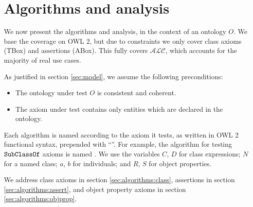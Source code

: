 \documentclass[paper.tex]{subfiles}
\begin{document}
\section{Algorithms and analysis}
\label{sec:algorithms}

We now present the algorithms and analysis, in the context of an ontology $O$.  We base the coverage on OWL 2, but due to constraints we only cover class axioms (TBox) and assertions (ABox).  This fully covers $\mathcal{ALC}$, which accounts for the majority of real use cases.  

As justified in section \ref{sec:model}, we assume the following preconditions:
\begin{itemize}[nosep]
  \item The ontology under test $O$ is consistent and coherent.
  \item The axiom under test contains only entities which are declared in the ontology.
\end{itemize}

Each algorithm is named according to the axiom it tests, as written in OWL 2 functional syntax, prepended with ``''.  For example, the algorithm for testing $\mathtt{SubClassOf}$ axioms is named .  We use the variables $C$, $D$ for class expressions; $N$ for a named class; $a$, $b$ for individuals; and $R$, $S$ for object properties.

We address class axioms in section \ref{sec:algorithms:class}, assertions in section \ref{sec:algorithms:assert}, and object property axioms in section \ref{sec:algorithms:objprop}.




\end{document}
